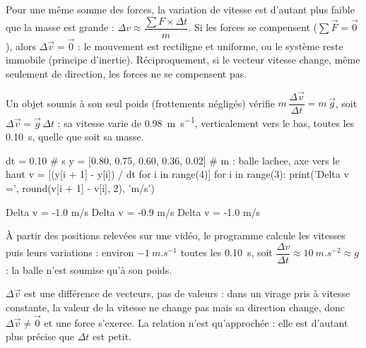 \par{}
\begin{propriete}
Pour une même somme des forces, la variation de vitesse est d'autant plus faible que la masse est grande : $\Delta v\approx\dfrac{\sum F\times\Delta t}{m}$.
Si les forces se compensent ($\sum\vec{F}=\vec{0}$), alors $\Delta\vec{v}=\vec{0}$ : le mouvement est rectiligne et uniforme, ou le système reste
immobile (principe d'inertie). Réciproquement, si le vecteur vitesse change, même seulement de direction, les forces ne se
compensent pas.
\end{propriete}
\begin{propriete}
Un objet soumis à son seul poids (frottements négligés) vérifie $m\,\dfrac{\Delta\vec{v}}{\Delta t}=m\,\vec{g}$, soit $\Delta\vec{v}=\vec{g}\,\Delta t$ : sa vitesse varie de
\qty{0,98}{m.s^{-1}}, verticalement vers le bas, toutes les \qty{0,10}{s}, quelle que soit sa masse.
\end{propriete}
\begin{python}
dt = 0.10                             # s
y = [0.80, 0.75, 0.60, 0.36, 0.02]    # m : balle lachee, axe vers le haut
v = [(y[i + 1] - y[i]) / dt for i in range(4)]
for i in range(3):
    print('Delta v =', round(v[i + 1] - v[i], 2), 'm/s')
\end{python}
\begin{console}
Delta v = -1.0 m/s
Delta v = -0.9 m/s
Delta v = -1.0 m/s
\end{console}
\noindent{} À partir des positions relevées sur une vidéo, le programme calcule les vitesses puis leurs variations :
environ $-\qty{1}{m.s^{-1}}$ toutes les \qty{0,10}{s}, soit $\dfrac{\Delta v}{\Delta t}\approx\qty{10}{m.s^{-2}}\approx g$ : la balle n'est soumise qu'à son poids.
\begin{attention}
$\Delta\vec{v}$ est une différence de vecteurs, pas de valeurs : dans un virage pris à vitesse constante, la valeur de la vitesse ne change
pas mais sa direction change, donc $\Delta\vec{v}\neq\vec{0}$ et une force s'exerce. La relation n'est qu'approchée : elle est d'autant plus
précise que $\Delta t$ est petit.
\end{attention}
